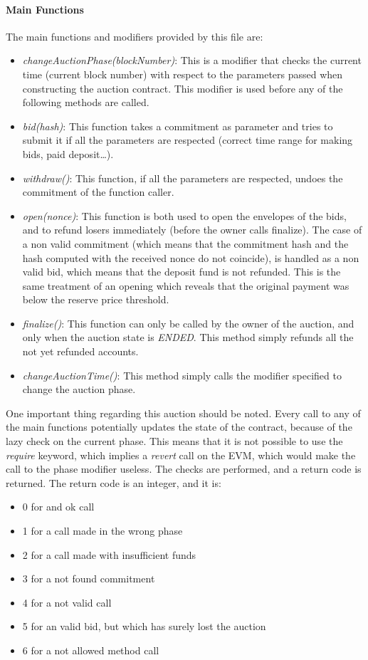 \documentclass[11pt, a4paper]{report}
\begin{document}
	\paragraph{Main Functions}
	The main functions and modifiers provided by this file are:
	\begin{itemize}
		\item \emph{changeAuctionPhase(blockNumber)}: This is a modifier that checks the current time (current block number) with respect to the parameters passed when constructing the auction contract. This modifier is used before any of the following methods are called.
		\item \emph{bid(hash)}: This function takes a commitment as parameter and tries to submit it if all the parameters are respected (correct time range for making bids, paid deposit\dots).
		\item \emph{withdraw()}: This function, if all the parameters are respected, undoes the commitment of the function caller.  
		\item \emph{open(nonce)}: This function is both used to open the envelopes of the bids, and to refund losers immediately (before the owner calls finalize). The case of a non valid commitment (which means that the commitment hash and the hash computed with the received nonce do not coincide), is handled as a non valid bid, which means that the deposit fund is not refunded. This is the same treatment of an opening which reveals that the original payment was below the reserve price threshold.
		\item \emph{finalize()}: This function can only be called by the owner of the auction, and only when the auction state is \emph{ENDED}. This method simply refunds all the not yet refunded accounts.
		\item \emph{changeAuctionTime()}: This method simply calls the modifier specified to change the auction phase.
	\end{itemize}
	One important thing regarding this auction should be noted. Every call to any of the main functions potentially updates the state of the contract, because of the lazy check on the current phase. This means that it is not possible to use the \emph{require} keyword, which implies a \emph{revert} call on the EVM, which would make the call to the phase modifier useless. The checks are performed, and a return code is returned.
	The return code is an integer, and it is:
	\begin{itemize}
		\item 0 for and ok call
		\item 1 for a call made in the wrong phase
		\item 2 for a call made with insufficient funds
		\item 3 for a not found commitment
		\item 4 for a not valid call
		\item 5 for an valid bid, but which has surely lost the auction
		\item 6 for a not allowed method call
	\end{itemize} 
\end{document}
